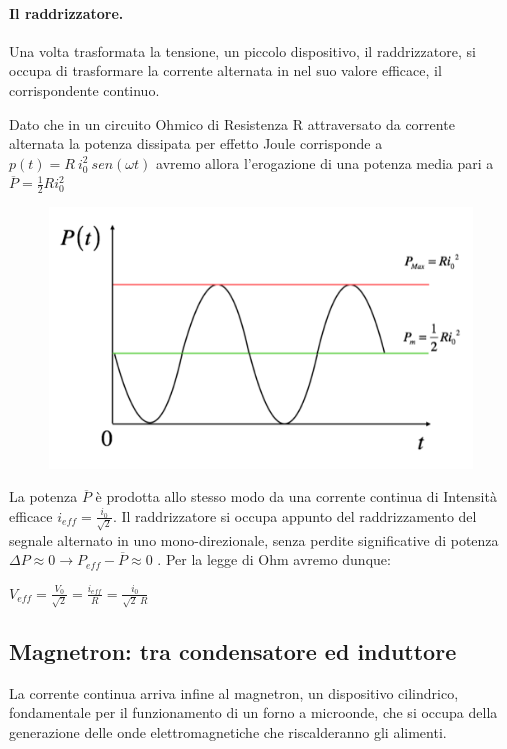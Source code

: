 \documentclass{article}
\begin{document}
\paragraph{Il raddrizzatore.}
Una volta trasformata la tensione, un piccolo dispositivo, il raddrizzatore, si occupa di trasformare la corrente alternata in  nel suo valore efficace, il corrispondente continuo.

Dato che in un circuito Ohmico di Resistenza R attraversato da corrente alternata la potenza dissipata per effetto Joule corrisponde a $ p (t) = R\ i_0^2\ sen(\omega t)$ avremo allora l'erogazione di una potenza media pari a $\overline{P} = \frac{1}{2} Ri_0^2$ 
\begin{figure}[h]
\centering
\includegraphics[scale=0.30]{4.png}
\label{fig: cubed graph}
\end{figure}

La potenza $\overline{P}$ è prodotta allo stesso modo da una corrente continua di Intensità efficace $i_{eff}= \frac{i_0}{\sqrt{2}}$. Il raddrizzatore si occupa appunto del raddrizzamento del segnale alternato in uno mono-direzionale, senza perdite significative di potenza $\Delta P \approx 0  \to P_{eff} -\overline{P} \approx 0$ .
Per la legge di Ohm avremo dunque:
\begin{center}
$V_{eff}= \frac{V_0}{\sqrt{2}} =  \frac{i_{eff}}{R}= \frac{i_0}{\sqrt{2}\ R} $
\end{center}
\newpage

\subsection{Magnetron: tra condensatore ed induttore}
La corrente continua arriva infine al magnetron, un dispositivo cilindrico, fondamentale per il funzionamento di un forno a microonde, che si occupa della generazione delle onde elettromagnetiche che riscalderanno gli alimenti.
\end{document}
